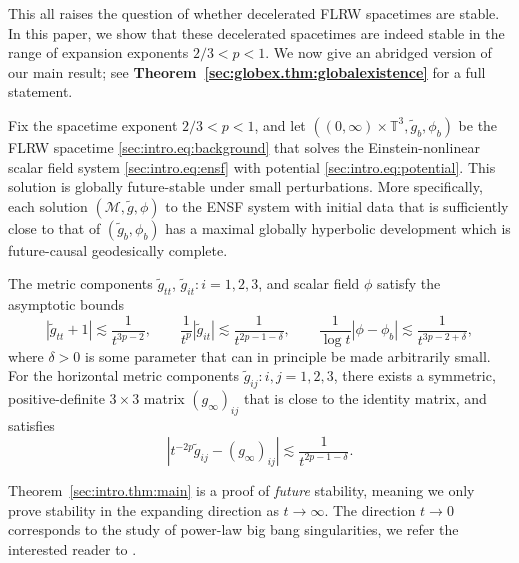\documentclass{article}
\newcommand{\TT}{\mathbb{T}}
\newcommand{\mc}{\mathcal}
\newcommand{\wt}{\widetilde}
\newcommand{\lesa}{\lesssim}
\newcommand{\ra}{\rightarrow}
\begin{document}
This all raises the question of whether decelerated FLRW spacetimes are stable. In this paper, we show that these decelerated spacetimes are indeed stable in the range of expansion exponents $2/3 < p < 1$. We now give an abridged version of our main result; see \textbf{Theorem~\ref{sec:globex.thm:globalexistence}} for a full statement.
\begin{theorem}\label{sec:intro.thm:main}
Fix the spacetime exponent $2/3 < p < 1$, and let $((0,\infty)\times \TT^3,\wt{g}_b,\phi_b)$ be the FLRW spacetime \eqref{sec:intro.eq:background} that solves the Einstein-nonlinear scalar field system \eqref{sec:intro.eq:ensf} with potential \eqref{sec:intro.eq:potential}. This solution is globally future-stable under small perturbations. More specifically, each solution $(\mc{M},\wt{g},\phi)$ to the ENSF system with initial data that is sufficiently close to that of $(\wt{g}_b,\phi_b)$ has a maximal globally hyperbolic development which is future-causal geodesically complete. 

The metric components $\wt{g}_{tt}$, $\wt{g}_{it}:i=1,2,3$, and scalar field $\phi$ satisfy the asymptotic bounds
\begin{equation}\label{sec:intro.eq:asymptotics1}
    |\wt{g}_{tt} + 1|\lesa \frac{1}{t^{3p-2}}, \qquad \frac{1}{t^p}|\wt{g}_{it}| \lesa \frac{1}{t^{2p-1-\delta}},\qquad \frac{1}{\log t}|\phi - \phi_b| \lesa \frac{1}{t^{3p-2+\delta}},
\end{equation}
where $\delta > 0$ is some parameter that can in principle be made arbitrarily small. For the horizontal metric components $\wt{g}_{ij}:i,j=1,2,3$,
there exists a symmetric, positive-definite $3\times 3$ matrix $(g_\infty)_{ij}$ that is close to the identity matrix, and satisfies
\begin{equation}\label{sec:intro.eq:asymptotics2}
    |t^{-2p}\wt{g}_{ij} - (g_{\infty})_{ij}| \lesa \frac{1}{t^{2p-1-\delta}}.
\end{equation}
\end{theorem}
\begin{remark}
    Theorem~\ref{sec:intro.thm:main} is a proof of \emph{future} stability, meaning we only prove stability in the expanding direction as $t \ra \infty$. The direction $t \ra 0$ corresponds to the study of power-law big bang singularities, we refer the interested reader to \cite{GroPetRin:quescientbigban:23}.
\end{remark}
\end{document}
